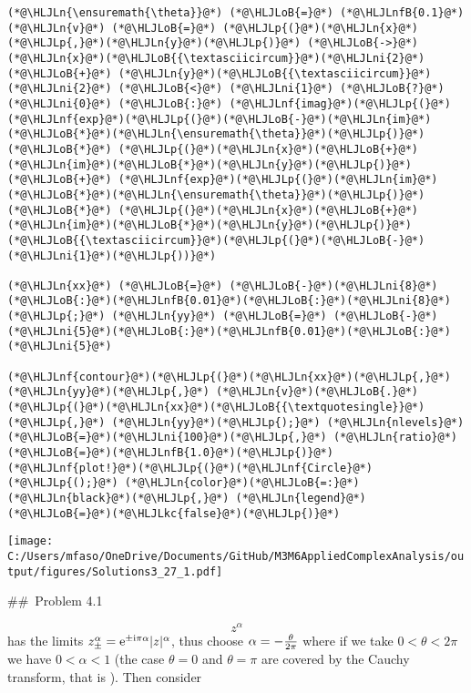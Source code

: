 \documentclass[12pt,a4paper]{article}
\newcommand{\HLJLkc}[1]{\textcolor[RGB]{59,151,46}{\textit{#1}}}
\newcommand{\HLJLn}[1]{#1}
\newcommand{\HLJLnf}[1]{\textcolor[RGB]{66,102,213}{#1}}
\newcommand{\HLJLnfB}[1]{\textcolor[RGB]{59,151,46}{#1}}
\newcommand{\HLJLni}[1]{\textcolor[RGB]{59,151,46}{#1}}
\newcommand{\HLJLoB}[1]{\textcolor[RGB]{102,102,102}{\textbf{#1}}}
\newcommand{\HLJLp}[1]{#1}
\def\I{ {\rm i} }
\def\E{ {\rm e} }
\begin{document}
\begin{lstlisting}
(*@\HLJLn{\ensuremath{\theta}}@*) (*@\HLJLoB{=}@*) (*@\HLJLnfB{0.1}@*)
(*@\HLJLn{v}@*) (*@\HLJLoB{=}@*) (*@\HLJLp{(}@*)(*@\HLJLn{x}@*)(*@\HLJLp{,}@*)(*@\HLJLn{y}@*)(*@\HLJLp{)}@*) (*@\HLJLoB{->}@*) (*@\HLJLn{x}@*)(*@\HLJLoB{{\textasciicircum}}@*)(*@\HLJLni{2}@*) (*@\HLJLoB{+}@*) (*@\HLJLn{y}@*)(*@\HLJLoB{{\textasciicircum}}@*)(*@\HLJLni{2}@*) (*@\HLJLoB{<}@*) (*@\HLJLni{1}@*) (*@\HLJLoB{?}@*) (*@\HLJLni{0}@*) (*@\HLJLoB{:}@*) (*@\HLJLnf{imag}@*)(*@\HLJLp{(}@*)(*@\HLJLnf{exp}@*)(*@\HLJLp{(}@*)(*@\HLJLoB{-}@*)(*@\HLJLn{im}@*)(*@\HLJLoB{*}@*)(*@\HLJLn{\ensuremath{\theta}}@*)(*@\HLJLp{)}@*) (*@\HLJLoB{*}@*) (*@\HLJLp{(}@*)(*@\HLJLn{x}@*)(*@\HLJLoB{+}@*)(*@\HLJLn{im}@*)(*@\HLJLoB{*}@*)(*@\HLJLn{y}@*)(*@\HLJLp{)}@*) (*@\HLJLoB{+}@*) (*@\HLJLnf{exp}@*)(*@\HLJLp{(}@*)(*@\HLJLn{im}@*)(*@\HLJLoB{*}@*)(*@\HLJLn{\ensuremath{\theta}}@*)(*@\HLJLp{)}@*) (*@\HLJLoB{*}@*) (*@\HLJLp{(}@*)(*@\HLJLn{x}@*)(*@\HLJLoB{+}@*)(*@\HLJLn{im}@*)(*@\HLJLoB{*}@*)(*@\HLJLn{y}@*)(*@\HLJLp{)}@*)(*@\HLJLoB{{\textasciicircum}}@*)(*@\HLJLp{(}@*)(*@\HLJLoB{-}@*)(*@\HLJLni{1}@*)(*@\HLJLp{))}@*)

(*@\HLJLn{xx}@*) (*@\HLJLoB{=}@*) (*@\HLJLoB{-}@*)(*@\HLJLni{8}@*)(*@\HLJLoB{:}@*)(*@\HLJLnfB{0.01}@*)(*@\HLJLoB{:}@*)(*@\HLJLni{8}@*)(*@\HLJLp{;}@*) (*@\HLJLn{yy}@*) (*@\HLJLoB{=}@*) (*@\HLJLoB{-}@*)(*@\HLJLni{5}@*)(*@\HLJLoB{:}@*)(*@\HLJLnfB{0.01}@*)(*@\HLJLoB{:}@*)(*@\HLJLni{5}@*)

(*@\HLJLnf{contour}@*)(*@\HLJLp{(}@*)(*@\HLJLn{xx}@*)(*@\HLJLp{,}@*) (*@\HLJLn{yy}@*)(*@\HLJLp{,}@*) (*@\HLJLn{v}@*)(*@\HLJLoB{.}@*)(*@\HLJLp{(}@*)(*@\HLJLn{xx}@*)(*@\HLJLoB{{\textquotesingle}}@*)(*@\HLJLp{,}@*) (*@\HLJLn{yy}@*)(*@\HLJLp{);}@*) (*@\HLJLn{nlevels}@*)(*@\HLJLoB{=}@*)(*@\HLJLni{100}@*)(*@\HLJLp{,}@*) (*@\HLJLn{ratio}@*)(*@\HLJLoB{=}@*)(*@\HLJLnfB{1.0}@*)(*@\HLJLp{)}@*)
(*@\HLJLnf{plot!}@*)(*@\HLJLp{(}@*)(*@\HLJLnf{Circle}@*)(*@\HLJLp{();}@*) (*@\HLJLn{color}@*)(*@\HLJLoB{=:}@*)(*@\HLJLn{black}@*)(*@\HLJLp{,}@*) (*@\HLJLn{legend}@*)(*@\HLJLoB{=}@*)(*@\HLJLkc{false}@*)(*@\HLJLp{)}@*)
\end{lstlisting}

\texttt{[image: C:/Users/mfaso/OneDrive/Documents/GitHub/M3M6AppliedComplexAnalysis/output/figures/Solutions3\_27\_1.pdf]}

\#\# Problem 4.1

\[
z^\alpha
\]
has the limits $z_\pm^\alpha = \E^{\pm \I  \pi \alpha} |z|^\alpha$, thus choose $\alpha = -{\theta \over 2\pi}$ where if we take $0 < \theta < 2\pi$ we have $0 < \alpha < 1$ (the case $\theta = 0$ and $\theta = \pi$ are covered by the Cauchy transform, that is ). Then consider
\end{document}
